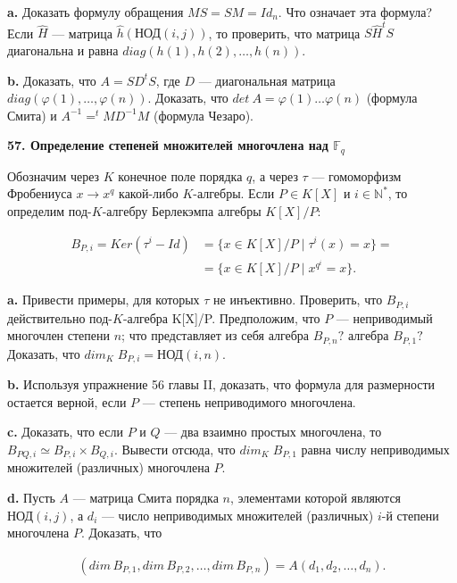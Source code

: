 \documentclass{mai_book}
\begin{document}
\smallskip
\textbf{a.} Доказать формулу обращения $MS=SM=Id_n$. 
Что означает эта формула? 
Если $\hat{H}$ --- матрица $\hat{h}(\text{НОД}(i,j))$, то проверить, что матрица $S\hat{H}^tS$ диагональна и равна $diag(h(1),h(2),\dots,h(n))$.

\smallskip
\textbf{b.} Доказать, что $A=SD^tS$, где $D$ --- диагональная матрица $diag(\varphi(1),\dots,\varphi(n))$. 
Доказать, что $det\:A=\varphi(1)\dots \varphi(n)$ (формула Смита) и $A^{-1}= ^t\!\!MD^{-1}M$ (формула Чезаро).

\bigskip
\noindent\textbf{57. Определение степеней множителей многочлена над $\mathbb{F}_q$}

\medskip
Обозначим через $K$ конечное поле порядка $q$, а через $\tau$ --- гомоморфизм Фробениуса $x \rightarrow x^q$ какой-либо $K$-алгебры. Если $P\in K[X]$ и $i\in \mathbb{N}^*$, то определим под-$K$-алгебру Берлекэмпа алгебры $K[X]/P:$


$$
\begin{aligned}
B_{P,i}=Ker(\tau^i-Id)&=\{x\in K[X]/P\;|\;\tau^i(x)=x\}=\\
                      &=\{x\in K[X]/P\;|\;x^{q^i}=x\}.
\end{aligned}
$$


\textbf{a.} Привести примеры, для которых $\tau$ не инъективно. 
Проверить, что $B_{P,i}$ действительно под-$K$-алгебра K[X]/P. 
Предположим, что $P$ — неприводимый многочлен степени $n$; что представляет из себя алгебра $B_{P,n}?$ алгебра
$B_{P,1}?$ Доказать, что $dim_K\;B_{P,i}=\text{НОД}(i,n)$.

\smallskip
\textbf{b.} Используя упражнение 56 главы II, доказать, что формула для размерности остается верной, если $P$ --- степень неприводимого мно­гочлена.

\newpage


\textbf{c.} Доказать, что если $P$ и $Q$ --- два взаимно простых многочлена, то $B_{PQ,i}\simeq B_{P,i}\times B_{Q,i}$. 
Вывести отсюда, что $dim_K\; B_{P,1}$ равна числу неприводимых множителей (различных) многочлена $P$.

\smallskip
\textbf{d.} Пусть $A$ --- матрица Смита порядка $n$, элементами которой явля­ются $\text{НОД}(i,j)$, а $d_i$ --- число неприводимых множителей (различных) $i$-й степени многочлена $P$. 
Доказать, что


$$
\begin{aligned}
(dim\,B_{P,1}, dim\,B_{P,2},\dots , dim\,B_{P,n})=A(d_1, d_2,\dots ,d_n).
\end{aligned}
$$
\end{document}
